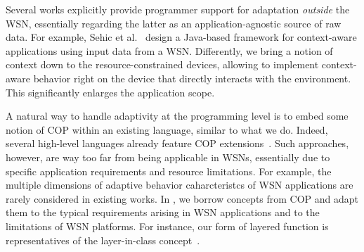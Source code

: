 
 Several works explicitly
provide programmer support for adaptation \emph{outside} the WSN,
essentially regarding the latter as an application-agnostic source of
raw data. For example, Sehic et al.~\cite{Sehic11} design a Java-based
framework for context-aware applications using input data from a
WSN. Differently, we bring a notion of context down to the
resource-constrained devices, allowing to implement context-aware
behavior right on the device that directly interacts with the
environment. This significantly enlarges the application scope.

A natural way to handle adaptivity at the programming level is to
embed some notion of COP within an existing language, similar to what
we do. Indeed, several high-level languages already feature COP
extensions~\cite{Bardram05,Ghezzi10,Kamina11,Salvaneschi12,Sehic11}.
Such approaches, however, are way too far from being applicable in
WSNs, essentially due to specific application requirements and
resource limitations. For example, the multiple dimensions of adaptive
behavior caharcteristcs of WSN applications are rarely considered in
existing works. In \conesc, we borrow concepts from COP and adapt them
to the typical requirements arising in WSN applications and to the
limitations of WSN platforms. For instance, our form of layered
function is representatives of the layer-in-class
concept~\cite{Salvaneschi12}.




